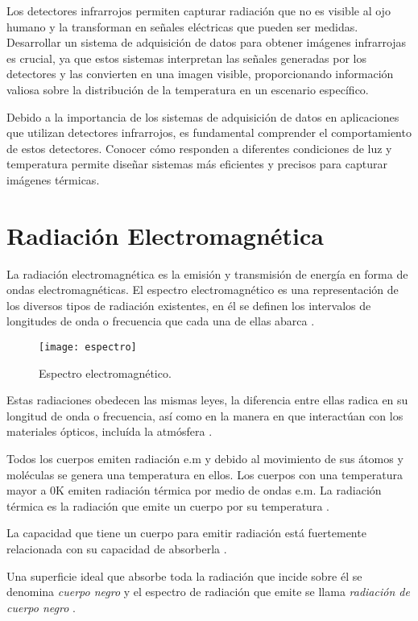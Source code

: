 Los detectores infrarrojos permiten capturar radiación que no es visible al ojo humano y la transforman en señales eléctricas que pueden ser medidas. Desarrollar un sistema de adquisición de datos para obtener imágenes infrarrojas es crucial, ya que estos sistemas interpretan las señales generadas por los detectores y las convierten en una imagen visible, proporcionando información valiosa sobre la distribución de la temperatura en un escenario específico.


Debido a la importancia de los sistemas de adquisición de datos en aplicaciones que utilizan detectores infrarrojos, es fundamental comprender el comportamiento de estos detectores. Conocer cómo responden a diferentes condiciones de luz y temperatura permite diseñar sistemas más eficientes y precisos para capturar imágenes térmicas.
    
    \section{Radiación Electromagnética}
    La radiación electromagnética es la emisión y transmisión de energía en forma de ondas electromagnéticas. El espectro electromagnético es una representación de los diversos tipos de radiación existentes, en él se definen los intervalos de longitudes de onda o frecuencia que cada una de ellas abarca \cite{Chang}.
            \begin{figure}[hbtp]
                \centering
                \texttt{[image: espectro]}
                \caption{Espectro electromagnético.}
                \label{fig:espectro}
            \end{figure}    
    
    Estas radiaciones obedecen las mismas leyes, la diferencia entre ellas radica en su longitud de onda o frecuencia, así como en la manera en que interactúan con los materiales ópticos, incluída la atmósfera \cite{Vincent}.
    
    Todos los cuerpos emiten radiación e.m  y debido al movimiento de sus átomos y moléculas se genera una temperatura en ellos. Los cuerpos con una temperatura mayor a 0K emiten radiación térmica por medio de ondas e.m. La radiación térmica es la radiación que emite un cuerpo por su temperatura \cite{Hollands}.
    
    La capacidad que tiene un cuerpo para emitir radiación está fuertemente relacionada con su capacidad de absorberla \cite{Beiser}.
    
    Una superficie ideal que absorbe toda la radiación que incide sobre él se denomina \textit{cuerpo negro} y el espectro de radiación que emite se llama \textit{radiación de cuerpo negro} \cite{Sears}.
    
